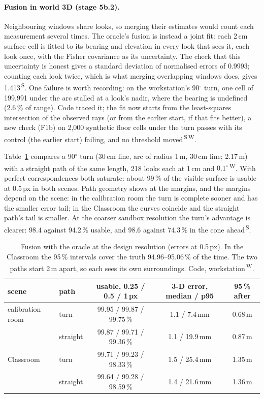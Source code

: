 \documentclass[11pt,a4paper]{article}
\newcommand{\src}[1]{\textsuperscript{\,#1}}
\newcommand{\WS}{\src{W}}   %
\newcommand{\SB}{\src{S}}   %
\begin{document}
\paragraph{Fusion in world 3D (stage 5b.2).} Neighbouring windows share looks, so merging their estimates would count each
measurement several times. The oracle's fusion is instead a joint fit: each 2\,cm surface cell is fitted to its bearing and
elevation in every look that sees it, each look once, with the Fisher covariance as its uncertainty. The check that this
uncertainty is honest gives a standard deviation of normalised errors of 0.9993; counting each look twice, which is what
merging overlapping windows does, gives 1.413\SB. One failure is worth recording: on the workstation's 90$^\circ$ turn, one
cell of 199{,}991 under the arc stalled at a look's nadir, where the bearing is undefined (2.6\,\% of range). Code traced it;
the fit now starts from the least-squares intersection of the observed rays (or from the earlier start, if that fits
better), a new check (F1b) on 2{,}000 synthetic floor cells under the turn passes with its control (the earlier start)
failing, and no threshold moved\SB\WS.

Table~\ref{tab:fusion} compares a 90$^\circ$ turn (30\,cm line, arc of radius 1\,m, 30\,cm line; 2.17\,m) with a straight
path of the same length, 218 looks each at 1\,cm and $0.1^\circ$\WS. With perfect correspondences both saturate: about
99\,\% of the visible surface is usable at 0.5\,px in both scenes. Path geometry shows at the margins, and the margins
depend on the scene: in the calibration room the turn is complete sooner and has the smaller error tail; in the Classroom
the curves coincide and the straight path's tail is smaller. At the coarser sandbox resolution the turn's advantage is
clearer: 98.4 against 94.2\,\% usable, and 98.6 against 74.3\,\% in the cone ahead\SB.

\begin{table}[h]
\centering\small
\begin{tabular}{@{}llccc@{}}
\toprule
scene & path & usable, 0.25 / 0.5 / 1\,px & 3-D error, median / p95 & 95\,\% after\\
\midrule
calibration room & turn & 99.95 / 99.87 / 99.75\,\% & 1.1 / 7.4\,mm & 0.68\,m\\
 & straight & 99.87 / 99.71 / 99.36\,\% & 1.1 / 19.9\,mm & 0.87\,m\\
Classroom & turn & 99.71 / 99.23 / 98.33\,\% & 1.5 / 25.4\,mm & 1.35\,m\\
 & straight & 99.64 / 99.28 / 98.59\,\% & 1.4 / 21.6\,mm & 1.36\,m\\
\bottomrule
\end{tabular}
\caption{Fusion with the oracle at the design resolution (errors at 0.5\,px). In the Classroom the 95\,\% intervals cover the
truth 94.96--95.06\,\% of the time.
The two paths start 2\,m apart, so each sees its own surroundings. Code, workstation\WS.}\label{tab:fusion}
\end{table}
\end{document}
